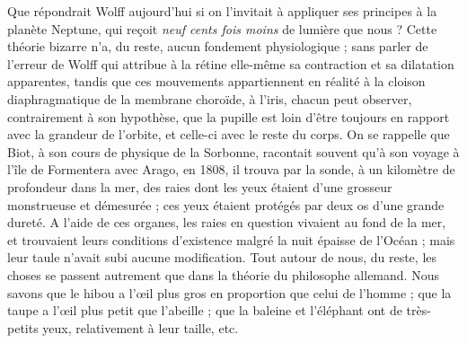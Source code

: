 \documentclass[a4paper, 11pt, oneside]{article}
\begin{document}
Que répondrait Wolff aujourd'hui si on l'invitait à appliquer ses principes à la planète Neptune, qui reçoit \emph{neuf cents fois moins} de lumière que nous ? Cette théorie bizarre n'a, du reste, aucun fondement physiologique ; sans parler de l'erreur de Wolff qui attribue à la rétine elle-même sa contraction et sa dilatation apparentes, tandis que ces mouvements appartiennent en réalité à la cloison diaphragmatique de la membrane choroïde, à l'iris, chacun peut observer, contrairement à son hypothèse, que la pupille est loin d'être toujours en rapport avec la grandeur de l'orbite, et celle-ci avec le reste du corps. On se rappelle que Biot, à son cours de physique de la Sorbonne, racontait souvent qu'à son voyage à l'île de Formentera avec Arago, en 1808, il trouva par la sonde, à un kilomètre de profondeur dans la mer, des raies dont les yeux étaient d'une grosseur monstrueuse et démesurée ; ces yeux étaient protégés par deux os d'une grande dureté. A l'aide de ces organes, les raies en question vivaient au fond de la mer, et trouvaient leurs conditions d'existence malgré la nuit épaisse de l'Océan ; mais leur taule n'avait subi aucune modification. Tout autour de nous, du reste, les choses se passent autrement que dans la théorie du philosophe allemand. Nous savons que le hibou a l'œil plus gros en proportion que celui de l'homme ; que la taupe a l'œil plus petit que l'abeille ; que la baleine et l'éléphant ont de très-petits yeux, relativement à leur taille, etc.
\end{document}
